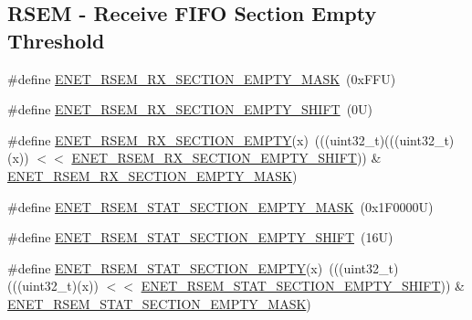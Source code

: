 \subsection*{R\+S\+EM -\/ Receive F\+I\+FO Section Empty Threshold}
\begin{DoxyCompactItemize}
\item 
\#define \mbox{\hyperlink{group___e_n_e_t___register___masks_ga7efbed880ef6db92d0b5afa9584e4a55}{E\+N\+E\+T\+\_\+\+R\+S\+E\+M\+\_\+\+R\+X\+\_\+\+S\+E\+C\+T\+I\+O\+N\+\_\+\+E\+M\+P\+T\+Y\+\_\+\+M\+A\+SK}}~(0x\+F\+F\+U)
\item 
\#define \mbox{\hyperlink{group___e_n_e_t___register___masks_gabd36b25a63e3ac019e1d718bb419f6b0}{E\+N\+E\+T\+\_\+\+R\+S\+E\+M\+\_\+\+R\+X\+\_\+\+S\+E\+C\+T\+I\+O\+N\+\_\+\+E\+M\+P\+T\+Y\+\_\+\+S\+H\+I\+FT}}~(0\+U)
\item 
\#define \mbox{\hyperlink{group___e_n_e_t___register___masks_gac9332cfad9880fac4809423931950e77}{E\+N\+E\+T\+\_\+\+R\+S\+E\+M\+\_\+\+R\+X\+\_\+\+S\+E\+C\+T\+I\+O\+N\+\_\+\+E\+M\+P\+TY}}(x)~(((uint32\+\_\+t)(((uint32\+\_\+t)(x)) $<$$<$ \mbox{\hyperlink{group___e_n_e_t___register___masks_gabd36b25a63e3ac019e1d718bb419f6b0}{E\+N\+E\+T\+\_\+\+R\+S\+E\+M\+\_\+\+R\+X\+\_\+\+S\+E\+C\+T\+I\+O\+N\+\_\+\+E\+M\+P\+T\+Y\+\_\+\+S\+H\+I\+FT}})) \& \mbox{\hyperlink{group___e_n_e_t___register___masks_ga7efbed880ef6db92d0b5afa9584e4a55}{E\+N\+E\+T\+\_\+\+R\+S\+E\+M\+\_\+\+R\+X\+\_\+\+S\+E\+C\+T\+I\+O\+N\+\_\+\+E\+M\+P\+T\+Y\+\_\+\+M\+A\+SK}})
\item 
\#define \mbox{\hyperlink{group___e_n_e_t___register___masks_ga2c9b27e42f02634896fac03a23270054}{E\+N\+E\+T\+\_\+\+R\+S\+E\+M\+\_\+\+S\+T\+A\+T\+\_\+\+S\+E\+C\+T\+I\+O\+N\+\_\+\+E\+M\+P\+T\+Y\+\_\+\+M\+A\+SK}}~(0x1\+F0000\+U)
\item 
\#define \mbox{\hyperlink{group___e_n_e_t___register___masks_ga4f6252fe71d82a4e4085cd0acf6893f8}{E\+N\+E\+T\+\_\+\+R\+S\+E\+M\+\_\+\+S\+T\+A\+T\+\_\+\+S\+E\+C\+T\+I\+O\+N\+\_\+\+E\+M\+P\+T\+Y\+\_\+\+S\+H\+I\+FT}}~(16\+U)
\item 
\#define \mbox{\hyperlink{group___e_n_e_t___register___masks_gadc4c382b7cc6428be891cdb2ed74a688}{E\+N\+E\+T\+\_\+\+R\+S\+E\+M\+\_\+\+S\+T\+A\+T\+\_\+\+S\+E\+C\+T\+I\+O\+N\+\_\+\+E\+M\+P\+TY}}(x)~(((uint32\+\_\+t)(((uint32\+\_\+t)(x)) $<$$<$ \mbox{\hyperlink{group___e_n_e_t___register___masks_ga4f6252fe71d82a4e4085cd0acf6893f8}{E\+N\+E\+T\+\_\+\+R\+S\+E\+M\+\_\+\+S\+T\+A\+T\+\_\+\+S\+E\+C\+T\+I\+O\+N\+\_\+\+E\+M\+P\+T\+Y\+\_\+\+S\+H\+I\+FT}})) \& \mbox{\hyperlink{group___e_n_e_t___register___masks_ga2c9b27e42f02634896fac03a23270054}{E\+N\+E\+T\+\_\+\+R\+S\+E\+M\+\_\+\+S\+T\+A\+T\+\_\+\+S\+E\+C\+T\+I\+O\+N\+\_\+\+E\+M\+P\+T\+Y\+\_\+\+M\+A\+SK}})
\end{DoxyCompactItemize}
